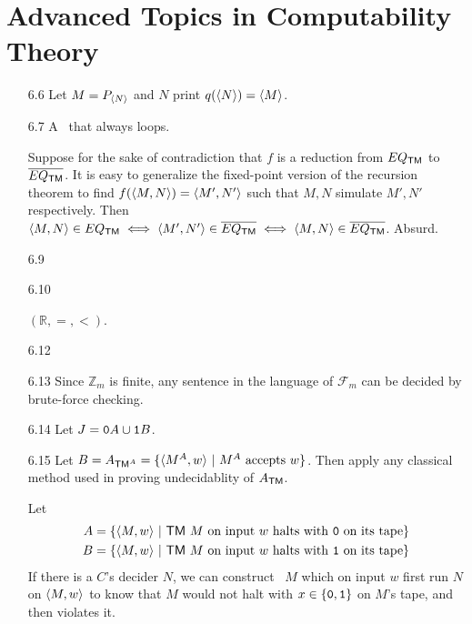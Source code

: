 \section{Advanced Topics in Computability Theory}

\begin{itemize}
	
	\item[6.6]
	Let $M = P_{\Bra{N}}$ and $N$ print $q(\Bra{N}) = \Bra{M}$.
	
	\item[6.7]
	A \TM\ that always loops.
	
	\item[\Star 6.8]
	Suppose for the sake of contradiction that $f$ is a reduction from $EQ_{\TM}$ to $\overline{EQ_{\TM}}$. It is easy to generalize the fixed-point version of the recursion theorem to find $f(\Bra{M, N}) = \Bra{M', N'}$ such that $M, N$ simulate $M', N'$ respectively. Then $\Bra{M, N} \in EQ_{\TM} \iff \Bra{M', N'} \in \overline{EQ_{\TM}} \iff \Bra{M, N} \in \overline{EQ_{\TM}}$. Absurd.
	
	\item[6.9]
	\Omit
	
	\item[6.10]
	\Omit
	
	\item[\Star 6.11]
	$(\mathbb{R}, =, <)$.
	
	\item[6.12]
	\Omit
	
	\item[6.13]
	Since $\mathbb{Z}_m$ is finite, any sentence in the language of $\mathcal{F}_m$ can be decided by brute-force checking.
	
	\item[6.14]
	Let $J = \TT{0}A \cup \TT{1}B$.
	
	\item[6.15]
	Let $B = A_{\TM^A} = \{ \Bra{M^{A}, w} \ | \ \text{$M^A$ accepts $w$} \}$. Then apply any classical method used in proving undecidablity of $A_{\TM}$.
	
	\item[\Star 6.16]
	\Empty
	
	\item[\Star 6.17]
	Let 
	\begin{align*}
		A = \{ \Bra{M, w} \ | \ \text{\TM\ $M$ on input $w$ halts with \TT{0} on its tape} \} \\
		B = \{ \Bra{M, w} \ | \ \text{\TM\ $M$ on input $w$ halts with \TT{1} on its tape} \}
	\end{align*}
	If there is a $C$'s decider $N$, we can construct \TM\ $M$ which on input $w$ first run $N$ on $\Bra{M, w}$ to know that $M$ would not halt with $x \in \{ \TT{0}, \TT{1} \}$ on $M$'s tape, and then violates it.
	

\end{itemize}
